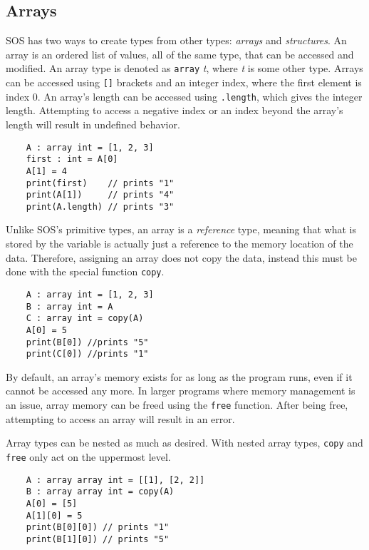 \documentclass[main.tex]{subfiles}
\begin{document}
	\subsection{Arrays}
	SOS has two ways to create types from other types: \textit{arrays} and \textit{structures}. An array is an ordered list of values, all of the same type, that can be accessed and modified. An array type is denoted as \texttt{array} \textit{t}, where \textit{t} is some other type. Arrays can be accessed using \texttt{[]} brackets and an integer index, where the first element is index 0. An array's length can be accessed using \texttt{.length}, which gives the integer length. Attempting to access a negative index or an index beyond the array's length will result in undefined behavior.
	
	\begin{lstlisting}
	A : array int = [1, 2, 3]
	first : int = A[0]
	A[1] = 4
	print(first)    // prints "1" 
	print(A[1])     // prints "4"
	print(A.length) // prints "3" \end{lstlisting}
	
	Unlike SOS's primitive types, an array is a \textit{reference} type, meaning that what is stored by the variable is actually just a reference to the memory location of the data. Therefore, assigning an array does not copy the data, instead this must be done with the special function \texttt{copy}.
	
	\begin{lstlisting}
	A : array int = [1, 2, 3]
	B : array int = A
	C : array int = copy(A)
	A[0] = 5
	print(B[0]) //prints "5"
	print(C[0]) //prints "1" \end{lstlisting}
	
	By default, an array's memory exists for as long as the program runs, even if it cannot be accessed any more. In larger programs where memory management is an issue, array memory can be freed using the \texttt{free} function. After being free, attempting to access an array will result in an error. \newline
	
	Array types can be nested as much as desired. With nested array types, \texttt{copy} and \texttt{free} only act on the uppermost level.
	
	\begin{lstlisting}
	A : array array int = [[1], [2, 2]]
	B : array array int = copy(A)
	A[0] = [5]
	A[1][0] = 5
	print(B[0][0]) // prints "1"
	print(B[1][0]) // prints "5" \end{lstlisting}
	
\end{document}
